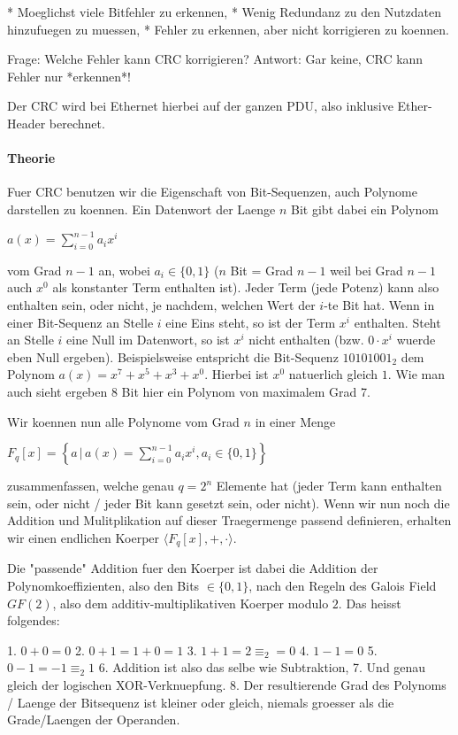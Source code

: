 * Moeglichst viele Bitfehler zu erkennen,
* Wenig Redundanz zu den Nutzdaten hinzufuegen zu muessen,
* Fehler zu erkennen, aber nicht korrigieren zu koennen.

Frage: Welche Fehler kann CRC korrigieren?
Antwort: Gar keine, CRC kann Fehler nur *erkennen*!

Der CRC wird bei Ethernet hierbei auf der ganzen PDU, also inklusive
Ether-Header berechnet.

\paragraph{Theorie} 

Fuer CRC benutzen wir die Eigenschaft von Bit-Sequenzen, auch Polynome
darstellen zu koennen. Ein Datenwort der Laenge $n$ Bit gibt dabei ein Polynom

$a(x) = \sum_{i=0}^{n - 1} a_i x^i$

vom Grad $n - 1$ an, wobei $a_i \in \{0, 1\}$ ($n$ Bit = Grad $n - 1$ weil bei
Grad $n - 1$ auch $x^0$ als konstanter Term enthalten ist). Jeder Term (jede
Potenz) kann also enthalten sein, oder nicht, je nachdem, welchen Wert der
$i$-te Bit hat. Wenn in einer Bit-Sequenz an Stelle $i$ eine Eins steht, so ist
der Term $x^i$ enthalten. Steht an Stelle $i$ eine Null im Datenwort, so ist
$x^i$ nicht enthalten (bzw. $0 \cdot x^i$ wuerde eben Null
ergeben). Beispielsweise entspricht die Bit-Sequenz $10101001_2$ dem Polynom
$a(x) = x^7 + x^5 + x^3 + x^0$. Hierbei ist $x^0$ natuerlich gleich $1$. Wie man
auch sieht ergeben 8 Bit hier ein Polynom von maximalem Grad 7.

Wir koennen nun alle Polynome vom Grad $n$ in einer Menge

$F_q[x] = \left\{a \,|\, a(x) = \sum_{i=0}^{n-1} a_ix^i, a_i \in \{0,
1\}\right\}$

zusammenfassen, welche genau $q = 2^n$ Elemente hat (jeder Term kann enthalten
sein, oder nicht / jeder Bit kann gesetzt sein, oder nicht). Wenn wir nun noch
die Addition und Mulitplikation auf dieser Traegermenge passend definieren,
erhalten wir einen endlichen Koerper $\langle F_q[x], +, \cdot \rangle$.

Die "passende" Addition fuer den Koerper ist dabei die Addition der
Polynomkoeffizienten, also den Bits $\in \{0, 1\}$, nach den Regeln des Galois
Field $GF(2)$, also dem additiv-multiplikativen Koerper modulo $2$. Das heisst
folgendes:

1. $0 + 0 = 0$
2. $0 + 1 = 1 + 0 = 1$
3. $1 + 1 = 2 \equiv_2 = 0$
4. $1 - 1 = 0$
5. $0 - 1 = -1 \equiv_2 1$
6. Addition ist also das selbe wie Subtraktion,
7. Und genau gleich der logischen XOR-Verknuepfung.
8. Der resultierende Grad des Polynoms / Laenge der Bitsequenz ist kleiner oder
   gleich, niemals groesser als die Grade/Laengen der Operanden.

